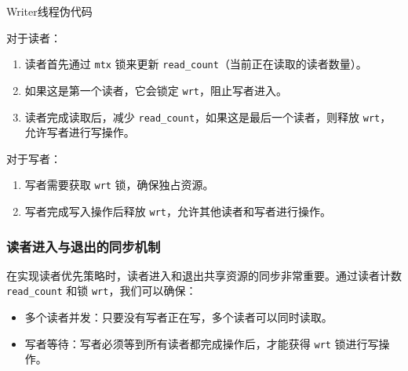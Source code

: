     \begin{algorithm}[htbp]
    \caption{Writer线程伪代码}
\end{algorithm}

对于读者：
\begin{enumerate}
    \item 读者首先通过 \texttt{mtx} 锁来更新 \texttt{read\_count}（当前正在读取的读者数量）。
    \item 如果这是第一个读者，它会锁定 \texttt{wrt}，阻止写者进入。
    \item 读者完成读取后，减少 \texttt{read\_count}，如果这是最后一个读者，则释放 \texttt{wrt}，允许写者进行写操作。
\end{enumerate}

对于写者：
\begin{enumerate}
    \item 写者需要获取 \texttt{wrt} 锁，确保独占资源。
	\item 写者完成写入操作后释放 \texttt{wrt}，允许其他读者和写者进行操作。
\end{enumerate}

\subsubsection{读者进入与退出的同步机制}

在实现读者优先策略时，读者进入和退出共享资源的同步非常重要。通过读者计数 \texttt{read\_count} 和锁 \texttt{wrt}，我们可以确保：\begin{itemize}
    \item 多个读者并发：只要没有写者正在写，多个读者可以同时读取。
	\item 写者等待：写者必须等到所有读者都完成操作后，才能获得 \texttt{wrt} 锁进行写操作。
\end{itemize}

